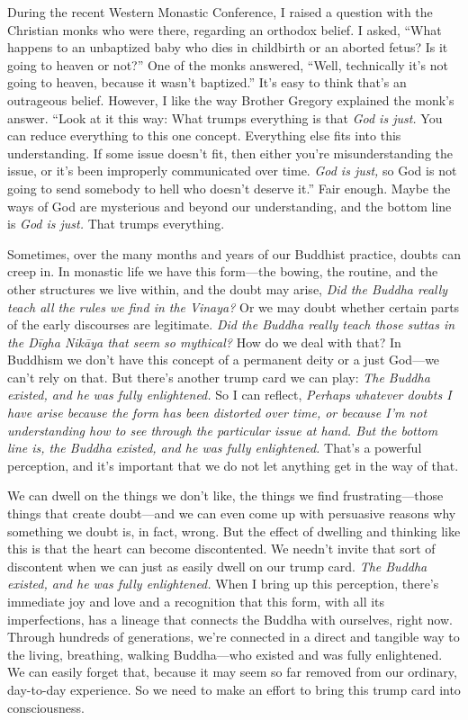 During the recent Western Monastic Conference, I raised a question with 
the Christian monks who were there, regarding an orthodox belief. I 
asked, ``What happens to an unbaptized baby who dies in childbirth or 
an aborted fetus? Is it going to heaven or not?'' One of the monks 
answered, ``Well, technically it's not going to heaven, because it 
wasn't baptized.'' It's easy to think that's an outrageous belief. 
However, I like the way Brother Gregory explained the monk's answer. 
``Look at it this way: What trumps everything is that \emph{God is 
just.} You can reduce everything to this one concept. Everything else 
fits into this understanding. If some issue doesn't fit, then either 
you're misunderstanding the issue, or it's been improperly communicated 
over time. \emph{God is just,} so God is not going to send somebody to 
hell who doesn't deserve it.'' Fair enough. Maybe the ways of God are 
mysterious and beyond our understanding, and the bottom line is 
\emph{God is just.} That trumps everything.

Sometimes, over the many months and years of our Buddhist practice, 
doubts can creep in. In monastic life we have this form---the bowing, 
the routine, and the other structures we live within, and the doubt may 
arise, \emph{Did the Buddha really teach all the rules we find in the 
Vinaya?} Or we may doubt whether certain parts of the early discourses 
are legitimate. \emph{Did the Buddha really teach those suttas in the 
Dīgha Nikāya that seem so mythical?} How do we deal with that? In 
Buddhism we don't have this concept of a permanent deity or a just 
God---we can't rely on that. But there's another trump card we can 
play: \emph{The Buddha existed, and he was fully enlightened.} So I can 
reflect, \emph{Perhaps whatever doubts I have arise because the form 
has been distorted over time, or because I'm not understanding how to 
see through the particular issue at hand. But the bottom line is, the 
Buddha existed, and he was fully enlightened.} That's a powerful 
perception, and it's important that we do not let anything get in the 
way of that.

We can dwell on the things we don't like, the things we find 
frustrating---those things that create doubt---and we can even come up 
with persuasive reasons why something we doubt is, in fact, wrong. But 
the effect of dwelling and thinking like this is that the heart can 
become discontented. We needn't invite that sort of discontent when we 
can just as easily dwell on our trump card. \emph{The Buddha existed, 
and he was fully enlightened.} When I bring up this perception, there's 
immediate joy and love and a recognition that this form, with all its 
imperfections, has a lineage that connects the Buddha with ourselves, 
right now. Through hundreds of generations, we're connected in a direct 
and tangible way to the living, breathing, walking Buddha---who existed 
and was fully enlightened. We can easily forget that, because it may 
seem so far removed from our ordinary, day-to-day experience. So we 
need to make an effort to bring this trump card into consciousness.

